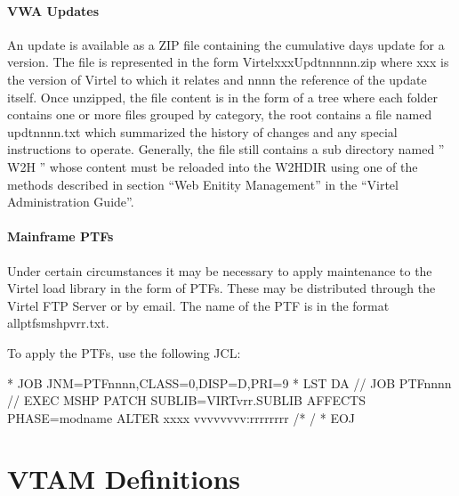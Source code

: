 \documentclass[letterpaper,10pt,english]{sphinxmanual}
\begin{document}
\subsubsection{VWA Updates}
\label{\detokenize{Installation_Guide:vwa-updates}}
\sphinxAtStartPar
An update is available as a ZIP file containing the cumulative days update for a version. The file is represented in the form VirtelxxxUpdtnnnnn.zip where xxx is the version of Virtel to which it relates and nnnn the reference of the update itself. Once unzipped, the file content is in the form of a tree where each folder contains one or more files grouped by category, the root contains a file named updtnnnn.txt which summarized the history of changes and any special instructions to operate. Generally, the file still contains a sub directory named ” W2H ” whose content must be reloaded into the W2H\sphinxhyphen{}DIR using one of the methods described in section “Web Enitity Management” in the “Virtel Administration Guide”.


\subsubsection{Mainframe PTFs}
\label{\detokenize{Installation_Guide:mainframe-ptfs}}
\sphinxAtStartPar
Under certain circumstances it may be necessary to apply maintenance to the Virtel load library in the form of PTFs. These may be distributed through the Virtel FTP Server or by e\sphinxhyphen{}mail. The name of the PTF is in the format allptfs\sphinxhyphen{}mshpvrr.txt.

\sphinxAtStartPar
To apply the PTFs, use the following JCL:

\begin{sphinxVerbatim}[commandchars=\\\{\}]
* \PYGZdl{}\PYGZdl{} JOB JNM=PTFnnnn,CLASS=0,DISP=D,PRI=9
* \PYGZdl{}\PYGZdl{} LST DA
// JOB PTFnnnn
// EXEC MSHP
  PATCH SUBLIB=VIRTvrr.SUBLIB
  AFFECTS PHASE=modname
  ALTER xxxx vvvvvvvv:rrrrrrrr
/*
/\PYGZam{}
* \PYGZdl{}\PYGZdl{} EOJ
\end{sphinxVerbatim}

\sphinxAtStartPar
{}

\ignorespaces 

\chapter{VTAM Definitions}
\label{\detokenize{Installation_Guide:vtam-definitions}}\label{\detokenize{Installation_Guide:index-20}}
\end{document}

